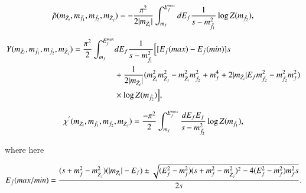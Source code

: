 \documentclass[final,3p,times]{elsarticle}
\begin{document}
\begin{equation} \label{rhotildaintegral}
\tilde{\rho}(m_{\tilde{Z}_i},m_{\tilde{f}_1},m_{\tilde{f}_2},m_{\tilde{Z}_j}) = -{\pi^2 \over 2 |m_{\tilde{Z}_i}|} \int_{m_{f}}^{E^{max}_{f}} dE_f {1 \over s-m_{\tilde{f}_1}^2} \log Z(m_{\tilde{f}_2}) ,
\end{equation}


\begin{equation} \label{Yintegral}
\begin{aligned}
Y(m_{\tilde{Z}_i},m_{\tilde{f}_1},m_{\tilde{f}_2},m_{\tilde{Z}_j}) = {\pi^2 \over 2} \int_{m_{f}}^{E^{max}_{f}} & dE_f {1 \over s-m_{\tilde{f}_1}^2}\Big[[E_{\bar{f}}(max) - E_{\bar{f}}(min)]s \\ & + {1 \over 2|m_{\tilde{Z}_i}|}(m_{\tilde{Z}_i}^2 m_{\tilde{Z}_j}^2 - m_{\tilde{Z}_i}^2 m_{\tilde{f}_2}^2 + m_{f}^4 + 2|m_{\tilde{Z}_i}|E_{f}m_{\tilde{f}_2}^2 - m_{\tilde{f}_2}^2 m_{f}^2) \\ & \times \log Z(m_{\tilde{f}_2})\Big] ,
\end{aligned}
\end{equation}


\begin{equation} \label{chiprimeintegral}
\chi^{'}(m_{\tilde{Z}_i},m_{\tilde{f}_1},m_{\tilde{f}_2},m_{\tilde{Z}_j}) = {-\pi^2 \over 2} \int_{m_{f}}^{E^{max}_{f}} {dE_f E_{f} \over s - m_{\tilde{f}_2}^2} \log Z(m_{\tilde{f}_1}),
\end{equation}

where here

\begin{equation}
E_{\bar{f}}(max/min) = {(s + m_{f}^2 - m_{\tilde{Z}_j}^2)(|m_{\tilde{Z}_i}|-E_{f}) \pm \sqrt{(E_{f}^2 - m_{f}^2)(s + m_{f}^2 - m_{\tilde{Z}_j}^2)^2 - 4(E_{f}^2 - m_{f}^2)m_{f}^2 s} \over 2s}.
\end{equation}
\end{document}
